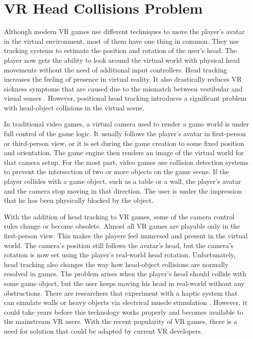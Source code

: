 \section{VR Head Collisions Problem}

Although modern VR games use different techniques to move the player's avatar in the virtual environment, most of them have one thing in common. They use tracking systems to estimate the position and rotation of the user's head. The player now gets the ability to look around the virtual world with physical head movements without the need of additional input controllers. Head tracking increases the feeling of presence in virtual reality. It also drastically reduces VR sickness symptoms that are caused due to the mismatch between vestibular and visual senses \cite{HEADTRACKINGSYMPTOMS}. However, positional head tracking introduces a significant problem with head-object collisions in the virtual scene.

In traditional video games, a virtual camera used to render a game world is under full control of the game logic. It usually follows the player's avatar in first-person or third-person view, or it is set during the game creation to some fixed position and orientation. The game engine then renders an image of the virtual world for that camera setup. For the most part, video games use collision detection systems to prevent the intersection of two or more objects on the game scene. If the player collides with a game object, such as a table or a wall, the player's avatar and the camera stop moving in that direction. The user is under the impression that he has been physically blocked by the object. 

With the addition of head tracking to VR games, some of the camera control rules change or become obsolete. Almost all VR games are playable only in the first-person view. This makes the players feel immersed and present in the virtual world. The camera's position still follows the avatar's head, but the camera's rotation is now set using the player’s real-world head rotation. Unfortunately, head tracking also changes the way how head-object collisions are normally resolved in games. The problem arises when the player's head should collide with some game object, but the user keeps moving his head in real-world without any obstructions. There are researchers that experiment with a haptic system that can simulate walls or heavy objects via electrical muscle stimulation \cite{HEPTICSYSTEM}. However, it could take years before this technology works properly and becomes available to the mainstream VR users. With the recent popularity of VR games, there is a need for solution that could be adapted by current VR developers.

